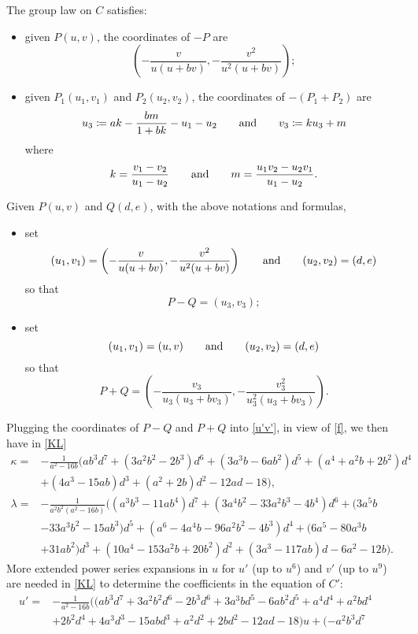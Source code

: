 \documentclass{gtpart}
\theoremstyle{definition}
\theoremstyle{remark}
\newcommand{\ad}{{\rm and}}
\newcommand{\K}{\kappa}
\begin{document}
The group law on $C$ satisfies: 
\begin{itemize}
 \item given $P(u,v)$, the coordinates of $-P$ are 
 \[
  \left( -\frac{v}{u (u + b v)},-\frac{v^2}{u^2 (u + b v)} \right); 
 \]

 \item given $P_1(u_1,v_1)$ and $P_2(u_2,v_2)$, the coordinates of 
 $-(P_1 + P_2)$ are 
 \[
  u_3 \coloneqq a k - \frac{b m}{1 + b k} - u_1 - u_2 \qquad \ad \qquad v_3 \coloneqq k u_3 + m 
 \]
 where 
 \[
  k = \frac{v_1 - v_2}{u_1 - u_2} \qquad \ad \qquad m = \frac{u_1 v_2 - u_2 v_1}{u_1 - u_2}.  
 \]
\end{itemize}
Given $P(u,v)$ and $Q(d,e)$, with the above notations and formulas, 
\begin{itemize}
 \item set 
 \[
  (u_1,v_1) = \left( -\frac{v}{u (u + b v)},-\frac{v^2}{u^2 (u + b v)} \right) \qquad \ad \qquad (u_2,v_2) = (d,e) 
 \]
 so that 
 \[
  P - Q = (u_3,v_3); 
 \]

 \item set 
 \[
  (u_1,v_1) = (u,v) \qquad \ad \qquad (u_2,v_2) = (d,e) 
 \]
 so that 
 \[
  P + Q = \left( -\frac{v_3}{u_3 (u_3 + b v_3)},-\frac{v_3^2}{u_3^2 (u_3 + b v_3)} \right).  
 \]
\end{itemize}
Plugging the coordinates of $P - Q$ and $P + Q$ into \eqref{u'v'}, in 
view of \eqref{f}, we then have in \eqref{KL} 
\begin{equation*}
\begin{split}
      \K = & -\frac{1}{a^2 - 16 b} \big( a b^3 d^7 + (3 a^2 b^2 - 2 b^3) d^6 + (3 a^3 b - 6 a b^2) d^5 + (a^4 + a^2 b + 2 b^2) d^4 \\
           & + (4 a^3 - 15 a b) d^3 + (a^2 + 2 b) d^2 - 12 a d - 18 \big), \\
 \lambda = & -\frac{1}{a^2 b^2 (a^2 - 16 b)} \big( (a^3  b^3 - 11 a b^4) d^7 + (3 a^4 b^2 - 33 a^2 b^3 - 4 b^4) d^6 + (3 a^5 b \\
           & - 33 a^3 b^2 - 15 a b^3) d^5 + (a^6 - 4 a^4 b - 96 a^2 b^2 - 4 b^3) d^4 + (6 a^5 - 80 a^3 b \\
           & + 31 a b^2) d^3 + (10 a^4 - 153 a^2 b + 20 b^2) d^2 + (3 a^3 - 117 a b) d - 6 a^2 - 12 b \big).  
\end{split}
\end{equation*}
More extended power series expansions in $u$ for $u'$ (up to $u^6$) and 
$v'$ (up to $u^9$) are needed in \eqref{KL} to determine the 
coefficients in the equation of $C'$: 
\begin{equation*}
\begin{split}
 u' = & -\frac{1}{a^2 - 16 b} \big( (a b^3 d^7 + 3 a^2 b^2 d^6 - 2 b^3 d^6 + 3 a^3 b d^5 - 6 a b^2 d^5 + a^4 d^4 + a^2 b d^4 \quad~~~ \\
      & + 2 b^2 d^4 + 4 a^3 d^3 - 15 a b d^3 + a^2 d^2 + 2 b d^2 - 12 a d - 18) u + (-a^2 b^3 d^7 
\end{split}
\end{equation*}
\end{document}
